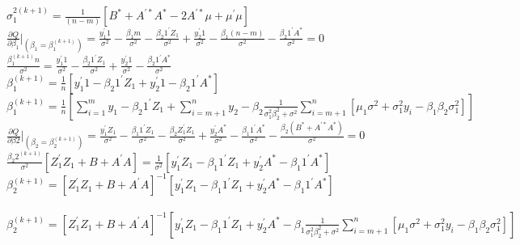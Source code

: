 \documentclass{article}\usepackage[]{graphicx}\usepackage[]{color}
\begin{document}
$\sigma_{1}^{2(k+1)}=\frac{1}{(n-m)}\left[B^{*}+A^{\prime *}A^{*}-2A^{\prime *}\mu+\mu^{\prime}\mu  \right]$ \vspace{5mm}\\


$\frac{\partial Q}{\partial \beta_{1}}|_{(\beta_{1}=\beta_{1}^{(k+1)})}=\frac{y_{1}^{\prime}1}{\sigma^{2}}-\frac{\beta_{1}m}{\sigma^{2}}-\frac{\beta_{2}1^{\prime}Z_{1}}{\sigma^{2}}+\frac{y_{2}^{\prime}1}{\sigma^{2}}-\frac{\beta_{1}(n-m)}{\sigma^{2}}-\frac{\beta_{2}1^{\prime}A^{*}}{\sigma^{2}}=0$\vspace{5mm}\\

$\frac{\beta_{1}^{(k+1)}n}{\sigma^{2}}=\frac{y_{1}^{\prime}1}{\sigma^{2}}-\frac{\beta_{2}1^{\prime}Z_{1}}{\sigma^{2}}+\frac{y_{2}^{\prime}1}{\sigma^{2}}-\frac{\beta_{2}1^{\prime}A^{*}}{\sigma^{2}}$\vspace{5mm}\\


$\beta_{1}^{(k+1)}=\frac{1}{n}\left[ y_{1}^{\prime}1-\beta_{2}1^{\prime}Z_{1}+y_{2}^{\prime}1  -\beta_{2}1^{\prime}A^{*}\right]$  \vspace{5mm}\\
$\beta_{1}^{(k+1)}=\frac{1}{n}\left[ \sum_{i=1}^{m}y_{1}-\beta_{2}1^{\prime}Z_{1}+\sum_{i=m+1}^{n} y_{2} -\beta_{2}\frac{1}{\sigma^{2}_{1}\beta_{2}^{2}+\sigma^{2}}\sum_{i=m+1}^{n}\left[\mu_{1}\sigma^{2}+\sigma_{1}^{2}y_{i}-\beta_{1}\beta_{2}\sigma_{1}^{2} \right]\right]$  \vspace{5mm}\\



$\frac{\partial Q}{\partial \beta{2}}|_{(\beta_{2}=\beta_{2}^{(k+1)})}=\frac{y_{1}^{\prime}Z_{1}}{\sigma^{2}}-\frac{\beta_{1}1^{\prime}Z_{1}}{\sigma^{2}}-\frac{\beta_{2}Z_{1}^{\prime}Z_{1}}{\sigma^{2}}+\frac{y_{2}^{\prime}A^{*}}{\sigma^{2}}-\frac{\beta_{1}1^{\prime}A^{*}}{\sigma^{2}}-\frac{\beta_{2}(B^{*}+A^{\prime *}A^{*})}{\sigma^{2}}=0$ \vspace{5mm}\\

$\frac{\beta_{2}2^{(k+1)}}{\sigma^{2}}[Z_{1}^{\prime}Z_{1}+B+A^{\prime}A]=\frac{1}{\sigma^2}[y_{1}^{\prime}Z_{1}-\beta_{1}1^{\prime}Z_{1}+y_{2}^{\prime}A^{*}-\beta_{1}1^{\prime}A^{*}]$  \vspace{5mm}\\
$\beta_{2}^{(k+1)}=[Z_{1}^{\prime}Z_{1}+B+A^{\prime}A]^{-1}[y_{1}^{\prime}Z_{1}-\beta_{1}1^{\prime}Z_{1}+y_{2}^{\prime}A^{*}-\beta_{1}1^{\prime}A^{*}]$  \vspace{5mm}\\
\vspace{5mm}\\
$\beta_{2}^{(k+1)}=[Z_{1}^{\prime}Z_{1}+B+A^{\prime}A]^{-1}\left [y_{1}^{\prime}Z_{1}-\beta_{1}1^{\prime}Z_{1}+y_{2}^{\prime}A^{*}-\beta_{1}\frac{1}{\sigma^{2}_{1}\beta_{2}^{2}+\sigma^{2}}\sum_{i=m+1}^{n}\left[\mu_{1}\sigma^{2}+\sigma_{1}^{2}y_{i}-\beta_{1}\beta_{2}\sigma_{1}^{2} \right] \right]$  \vspace{5mm}\\
\end{document}

